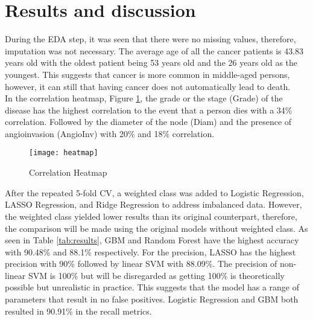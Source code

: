 \documentclass[11pt,singlespace]{article}
\begin{document}
	\section{Results and discussion}
	During the EDA step, it was seen that there were no missing values, therefore, imputation was not necessary. The average age of all the cancer patients is 43.83 years old with the oldest patient being 53 years old and the 26 years old as the youngest. This suggests that cancer is more common in middle-aged persons, however, it can still that having cancer does not automatically lead to death.
	\\
	
	In the correlation heatmap, Figure \ref{fig:heatmap}, the grade or the stage (Grade) of the disease has the highest correlation to the event that a person dies with a 34\% correlation. Followed by the diameter of the node (Diam) and the presence of angioinvasion (AngioInv) with 20\% and 18\% correlation.
	\\
	
		\begin{figure}[h]
			\centering
			\texttt{[image: heatmap]}
			\caption{Correlation Heatmap}
			\label{fig:heatmap}
		\end{figure}
		
		After the repeated 5-fold CV, a weighted class was added to Logistic Regression, LASSO Regression, and Ridge Regression to address imbalanced data. However, the weighted class yielded lower results than its original counterpart, therefore, the comparison will be made using the original models without weighted class. As seen in Table \ref{tab:results}, GBM and Random Forest have the highest accuracy with 90.48\% and 88.1\% respectively. For the precision, LASSO has the highest precision with 90\% followed by linear SVM with 88.09\%. The precision of non-linear SVM is 100\% but will be disregarded as getting 100\% is theoretically possible but unrealistic in practice. This suggests that the model has a range of parameters that result in no false positives. Logistic Regression and GBM both resulted in 90.91\% in the recall metrics.  
		
\end{document}

